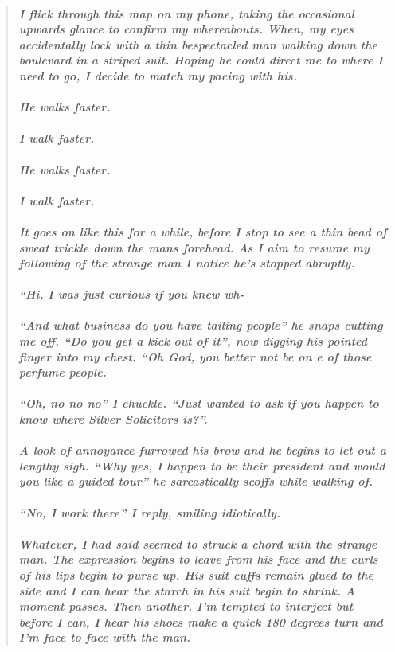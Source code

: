\documentclass{book}
\begin{document}
\begin{quote}
\paragraph{\textit{I flick through this map on my phone, taking the occasional upwards glance to confirm my whereabouts.
When, my eyes accidentally lock with a thin bespectacled man walking down the boulevard in a striped suit.
Hoping he could direct me to where I need to go, I decide to match my pacing with his.
\\\\He walks faster.
\\\\I walk faster.
\\\\He walks faster.
\\\\I walk faster.
\\\\It goes on like this for a while, before I stop to see a thin bead of sweat trickle down the mans forehead. As I aim to resume my following of the strange man I notice he's stopped abruptly.
\\\\``Hi, I was just curious if you knew wh-
\\\\``And what business do you have tailing people'' he snaps cutting me off. ``Do you get a kick out of it'', now digging his pointed finger into my chest. ``Oh God, you better not be on e of those perfume people.
\\\\``Oh, no no no'' I chuckle. ``Just wanted to ask if you happen to know where Silver Solicitors is?''.
\\\\A look of annoyance furrowed his brow and he begins to let out a lengthy sigh. ``Why yes, I happen to be their president and would you like a guided tour'' he sarcastically scoffs while walking of.
\\\\``No, I work there'' I reply, smiling idiotically.
\\\\Whatever, I had said seemed to struck a chord with the strange man. The expression begins to leave from his face and the curls of his lips begin to purse up.
His suit cuffs remain glued to the side and I can hear the starch in his suit begin to shrink.
A moment passes.
Then another.
I'm tempted to interject but before I can, I hear his shoes make a quick 180 degrees turn and I'm face to face with the man.
}}
\end{quote}
\end{document}
